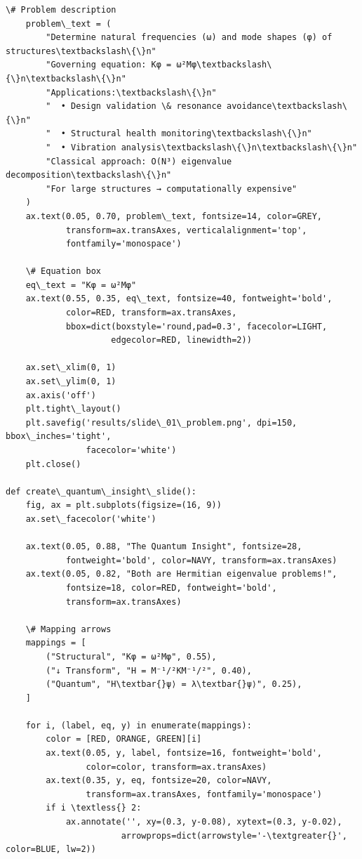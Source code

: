 \documentclass[12pt, a4paper]{article}
\begin{document}
\begin{lstlisting}[style=codestyle, caption={{generate_presentation.py --- Slide Generator}}]
    \# Problem description
    problem\_text = (
        "Determine natural frequencies (ω) and mode shapes (φ) of structures\textbackslash\{\}n"
        "Governing equation: Kφ = ω²Mφ\textbackslash\{\}n\textbackslash\{\}n"
        "Applications:\textbackslash\{\}n"
        "  • Design validation \& resonance avoidance\textbackslash\{\}n"
        "  • Structural health monitoring\textbackslash\{\}n"
        "  • Vibration analysis\textbackslash\{\}n\textbackslash\{\}n"
        "Classical approach: O(N³) eigenvalue decomposition\textbackslash\{\}n"
        "For large structures → computationally expensive"
    )
    ax.text(0.05, 0.70, problem\_text, fontsize=14, color=GREY,
            transform=ax.transAxes, verticalalignment='top',
            fontfamily='monospace')

    \# Equation box
    eq\_text = "Kφ = ω²Mφ"
    ax.text(0.55, 0.35, eq\_text, fontsize=40, fontweight='bold',
            color=RED, transform=ax.transAxes,
            bbox=dict(boxstyle='round,pad=0.3', facecolor=LIGHT,
                     edgecolor=RED, linewidth=2))

    ax.set\_xlim(0, 1)
    ax.set\_ylim(0, 1)
    ax.axis('off')
    plt.tight\_layout()
    plt.savefig('results/slide\_01\_problem.png', dpi=150, bbox\_inches='tight',
                facecolor='white')
    plt.close()

def create\_quantum\_insight\_slide():
    fig, ax = plt.subplots(figsize=(16, 9))
    ax.set\_facecolor('white')

    ax.text(0.05, 0.88, "The Quantum Insight", fontsize=28,
            fontweight='bold', color=NAVY, transform=ax.transAxes)
    ax.text(0.05, 0.82, "Both are Hermitian eigenvalue problems!",
            fontsize=18, color=RED, fontweight='bold',
            transform=ax.transAxes)

    \# Mapping arrows
    mappings = [
        ("Structural", "Kφ = ω²Mφ", 0.55),
        ("↓ Transform", "H = M⁻¹/²KM⁻¹/²", 0.40),
        ("Quantum", "H\textbar{}ψ⟩ = λ\textbar{}ψ⟩", 0.25),
    ]

    for i, (label, eq, y) in enumerate(mappings):
        color = [RED, ORANGE, GREEN][i]
        ax.text(0.05, y, label, fontsize=16, fontweight='bold',
                color=color, transform=ax.transAxes)
        ax.text(0.35, y, eq, fontsize=20, color=NAVY,
                transform=ax.transAxes, fontfamily='monospace')
        if i \textless{} 2:
            ax.annotate('', xy=(0.3, y-0.08), xytext=(0.3, y-0.02),
                       arrowprops=dict(arrowstyle='-\textgreater{}', color=BLUE, lw=2))


\end{lstlisting}
\end{document}
